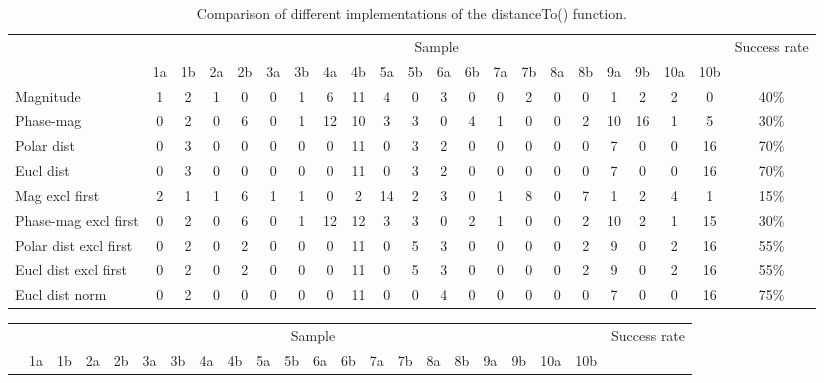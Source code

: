\begin{landscape}
	\begin{table}[p]
		\centering
		\begin{tabular}{|l|c@{ }c|c@{ }c|c@{ }c|c@{ }c|c@{ }c|c@{ }c|c@{ }c|c@{ }c|c@{ }c|c@{ }c|c|}
			\hline
			& \multicolumn{20}{|c|}{Sample} & Success rate \\
			& 1a & 1b & 2a & 2b & 3a & 3b & 4a & 4b & 5a & 5b & 6a & 6b & 7a & 7b & 8a & 8b & 9a & 9b & 10a & 10b & \\
			
			\hline
			Magnitude                  & 1 & 2 & 1 & 0 & 0 & 1 & 6 & 11 & 4 & 0 & 3 & 0 & 0 & 2 & 0 & 0 & 1 & 2 & 2 & 0 & 40\% \\
			Phase-mag                  & 0 & 2 & 0 & 6 & 0 & 1 & 12 & 10 & 3 & 3 & 0 & 4 & 1 & 0 & 0 & 2 & 10 & 16 & 1 & 5 & 30\% \\
			Polar dist                 & 0 & 3 & 0 & 0 & 0 & 0 & 0 & 11 & 0 & 3 & 2 & 0 & 0 & 0 & 0 & 0 & 7 & 0 & 0 & 16 & 70\% \\
			Eucl dist                  & 0 & 3 & 0 & 0 & 0 & 0 & 0 & 11 & 0 & 3 & 2 & 0 & 0 & 0 & 0 & 0 & 7 & 0 & 0 & 16 & 70\% \\
			
			\hline
			Mag excl first             & 2 & 1 & 1 & 6 & 1 & 1 & 0 & 2 & 14 & 2 & 3 & 0 & 1 & 8 & 0 & 7 & 1 & 2 & 4 & 1 & 15\% \\
			Phase-mag excl first       & 0 & 2 & 0 & 6 & 0 & 1 & 12 & 12 & 3 & 3 & 0 & 2 & 1 & 0 & 0 & 2 & 10 & 2 & 1 & 15 & 30\% \\
			Polar dist excl first      & 0 & 2 & 0 & 2 & 0 & 0 & 0 & 11 & 0 & 5 & 3 & 0 & 0 & 0 & 0 & 2 & 9 & 0 & 2 & 16 & 55\% \\
			Eucl dist excl first       & 0 & 2 & 0 & 2 & 0 & 0 & 0 & 11 & 0 & 5 & 3 & 0 & 0 & 0 & 0 & 2 & 9 & 0 & 2 & 16 & 55\% \\
			
			\hline
			Eucl dist norm             & 0 & 2 & 0 & 0 & 0 & 0 & 0 & 11 & 0 & 0 & 4 & 0 & 0 & 0 & 0 & 0 & 7 & 0 & 0 & 16 & 75\% \\
			
			\hline
		\end{tabular}
		\caption{Comparison of different implementations of the distanceTo() function.}
		\label{ClassificationResults}
	\end{table}
	
	\begin{table}[p]
		\centering
		\begin{tabular}{|l|c@{ }c|c@{ }c|c@{ }c|c@{ }c|c@{ }c|c@{ }c|c@{ }c|c@{ }c|c@{ }c|c@{ }c|c|}
			\hline
			& \multicolumn{20}{|c|}{Sample} & Success rate \\
			& 1a & 1b & 2a & 2b & 3a & 3b & 4a & 4b & 5a & 5b & 6a & 6b & 7a & 7b & 8a & 8b & 9a & 9b & 10a & 10b & \\
			

\end{tabular}
\end{table}
\end{landscape}
